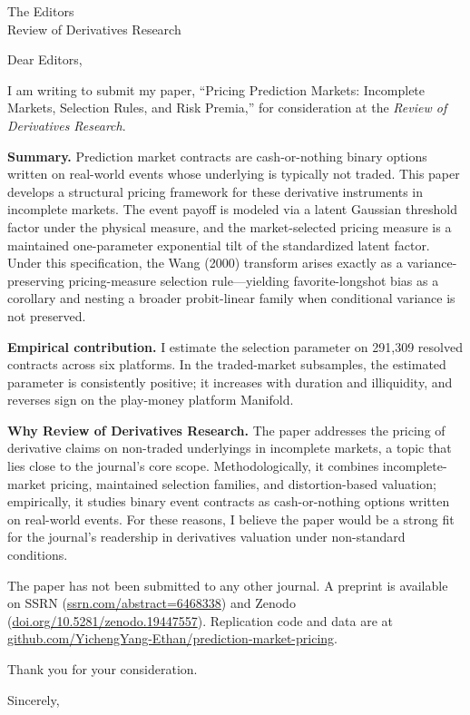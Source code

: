 \documentclass[12pt]{letter}
\begin{document}
\begin{letter}{The Editors\\Review of Derivatives Research}

\opening{Dear Editors,}

I am writing to submit my paper, ``Pricing Prediction Markets: Incomplete Markets, Selection Rules, and Risk Premia,'' for consideration at the \textit{Review of Derivatives Research}.

\textbf{Summary.} Prediction market contracts are cash-or-nothing binary options written on real-world events whose underlying is typically not traded. This paper develops a structural pricing framework for these derivative instruments in incomplete markets. The event payoff is modeled via a latent Gaussian threshold factor under the physical measure, and the market-selected pricing measure is a maintained one-parameter exponential tilt of the standardized latent factor. Under this specification, the Wang (2000) transform arises exactly as a variance-preserving pricing-measure selection rule---yielding favorite-longshot bias as a corollary and nesting a broader probit-linear family when conditional variance is not preserved.

\textbf{Empirical contribution.} I estimate the selection parameter on 291,309 resolved contracts across six platforms. In the traded-market subsamples, the estimated parameter is consistently positive; it increases with duration and illiquidity, and reverses sign on the play-money platform Manifold.

\textbf{Why Review of Derivatives Research.} The paper addresses the pricing of derivative claims on non-traded underlyings in incomplete markets, a topic that lies close to the journal's core scope. Methodologically, it combines incomplete-market pricing, maintained selection families, and distortion-based valuation; empirically, it studies binary event contracts as cash-or-nothing options written on real-world events. For these reasons, I believe the paper would be a strong fit for the journal's readership in derivatives valuation under non-standard conditions.

The paper has not been submitted to any other journal. A preprint is available on SSRN (\href{https://ssrn.com/abstract=6468338}{ssrn.com/abstract=6468338}) and Zenodo (\href{https://doi.org/10.5281/zenodo.19447557}{doi.org/10.5281/zenodo.19447557}). Replication code and data are at \href{https://github.com/YichengYang-Ethan/prediction-market-pricing}{github.com/YichengYang-Ethan/prediction-market-pricing}.

Thank you for your consideration.

\closing{Sincerely,}

\end{letter}
\end{document}

